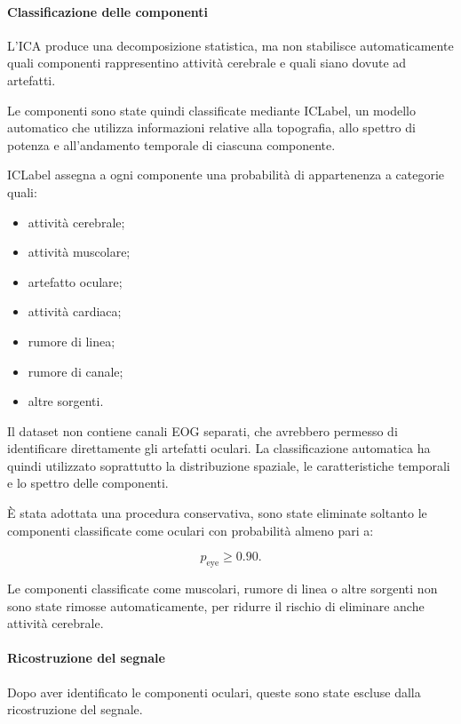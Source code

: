 \paragraph{Classificazione delle componenti}

L'ICA produce una decomposizione statistica, ma non stabilisce
automaticamente quali componenti rappresentino attività cerebrale e
quali siano dovute ad artefatti.

Le componenti sono state quindi classificate mediante ICLabel, un
modello automatico che utilizza informazioni relative alla topografia,
allo spettro di potenza e all'andamento temporale di ciascuna
componente.

ICLabel assegna a ogni componente una probabilità di appartenenza a
categorie quali:

\begin{itemize}
	\item attività cerebrale;
	\item attività muscolare;
	\item artefatto oculare;
	\item attività cardiaca;
	\item rumore di linea;
	\item rumore di canale;
	\item altre sorgenti.
\end{itemize}

Il dataset non contiene canali EOG separati, che avrebbero permesso
di identificare direttamente gli artefatti oculari. La classificazione
automatica ha quindi utilizzato soprattutto la distribuzione spaziale,
le caratteristiche temporali e lo spettro delle componenti.

È stata adottata una procedura conservativa, sono state eliminate
soltanto le componenti classificate come oculari con probabilità
almeno pari a:

\begin{equation}
	p_{\mathrm{eye}}
	\geq
	0.90.
\end{equation}

Le componenti classificate come muscolari, rumore di linea o altre
sorgenti non sono state rimosse automaticamente, per ridurre il
rischio di eliminare anche attività cerebrale.


\paragraph{Ricostruzione del segnale}

Dopo aver identificato le componenti oculari, queste sono state
escluse dalla ricostruzione del segnale.

